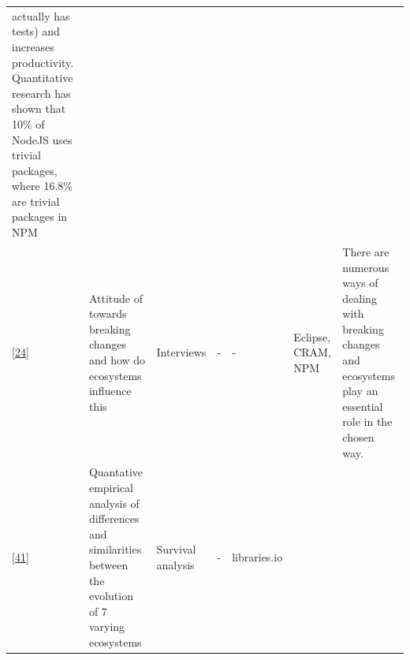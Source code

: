 \documentclass[]{book}
\begin{document}
\begin{longtable}[]{@{}lllllll@{}}
\begin{minipage}[t]{0.10\columnwidth}
actually has tests) and increases productivity. Quantitative research
has shown that 10\% of NodeJS uses trivial packages, where 16.8\% are
trivial packages in NPM\strut
\end{minipage}\tabularnewline
\begin{minipage}[t]{0.09\columnwidth}\raggedright\strut
{[}\protect\hyperlink{ref-Bogart2016}{24}{]}\strut
\end{minipage} & \begin{minipage}[t]{0.16\columnwidth}\raggedright\strut
Attitude of towards breaking changes and how do ecosystems influence
this\strut
\end{minipage} & \begin{minipage}[t]{0.17\columnwidth}\raggedright\strut
Interviews\strut
\end{minipage} & \begin{minipage}[t]{0.07\columnwidth}\raggedright\strut
-\strut
\end{minipage} & \begin{minipage}[t]{0.10\columnwidth}\raggedright\strut
-\strut
\end{minipage} & \begin{minipage}[t]{0.12\columnwidth}\raggedright\strut
Eclipse, CRAM, NPM\strut
\end{minipage} & \begin{minipage}[t]{0.10\columnwidth}\raggedright\strut
There are numerous ways of dealing with breaking changes and ecosystems
play an essential role in the chosen way.\strut
\end{minipage}\tabularnewline
\begin{minipage}[t]{0.09\columnwidth}\raggedright\strut
{[}\protect\hyperlink{ref-Decan2018}{41}{]}\strut
\end{minipage} & \begin{minipage}[t]{0.16\columnwidth}\raggedright\strut
Quantative empirical analysis of differences and similarities between
the evolution of 7 varying ecosystems\strut
\end{minipage} & \begin{minipage}[t]{0.17\columnwidth}\raggedright\strut
Survival analysis\strut
\end{minipage} & \begin{minipage}[t]{0.07\columnwidth}\raggedright\strut
-\strut
\end{minipage} & \begin{minipage}[t]{0.10\columnwidth}\raggedright\strut
libraries.io\strut
\end{minipage} & \begin{minipage}[t]{0.12\columnwidth}\raggedright\strut

\end{minipage}
\end{longtable}
\end{document}
